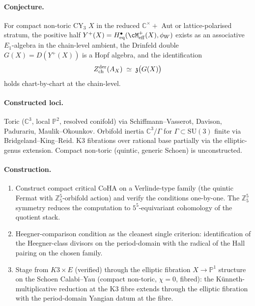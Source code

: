 \paragraph{Conjecture.} For compact non-toric
$\mathrm{CY}_3$ $X$ in the reduced $\mathbb{C}^\times +$ Aut or
lattice-polarised stratum, the positive half
$Y^+(X) = H^\bullet_{\mathrm{eq}}(\cM^+_{\mathrm{eff}}(X), \phi_W)$
exists as an associative $E_1$-algebra in the chain-level ambient, the
Drinfeld double $G(X) = D(Y^+(X))$ is a Hopf algebra, and the
identification
\[
Z^{\mathrm{der}}_{\mathrm{ch}}(A_X) \;\simeq\; \mathfrak{z}\bigl(G(X)\bigr)
\]
holds chart-by-chart at the chain-level.

\paragraph{Constructed loci.} Toric ($\mathbb{C}^3$, local $\mathbb{P}^2$,
resolved conifold) via Schiffmann--Vasserot, Davison, Padurariu, Maulik--Okounkov.
Orbifold inertia $\mathbb{C}^3 / \Gamma$ for $\Gamma \subset \mathrm{SU}(3)$
finite via Bridgeland--King--Reid. K3 fibrations over rational base
partially via the elliptic-genus extension. Compact non-toric (quintic,
generic Schoen) is unconstructed.

\paragraph{Construction.}
\begin{enumerate}[nosep]
\item Construct compact critical CoHA on a Verlinde-type family
  (the quintic Fermat with $\mathbb{Z}_5^5$-orbifold action) and verify
	  the conditions one-by-one. The $\mathbb{Z}_5^5$ symmetry reduces the
  computation to $5^5$-equivariant cohomology of the quotient stack.
\item Heegner-comparison condition as the cleanest single criterion:
  identification of the Heegner-class divisors on the period-domain
  with the radical of the Hall pairing on the chosen family.
\item Stage from $K3 \times E$ (verified) through the elliptic
  fibration $X \to \mathbb{P}^1$ structure on the Schoen Calabi--Yau
  (compact non-toric, $\chi = 0$, fibred): the K\"unneth-multiplicative
  reduction at the K3 fibre extends through the elliptic fibration with
  the period-domain Yangian datum at the fibre.
\end{enumerate}

